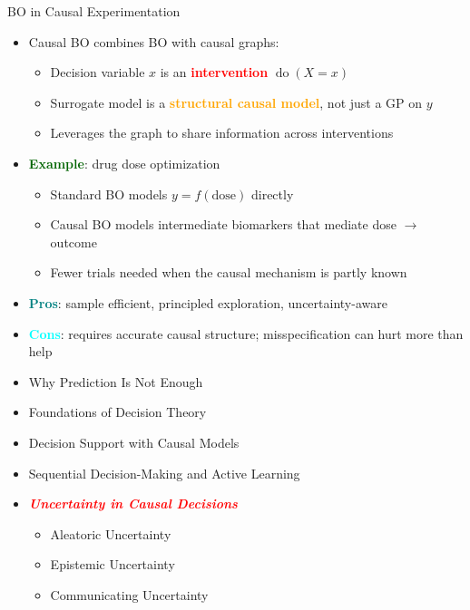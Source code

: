\documentclass[
  10pt,
  ignorenonframetext,
]{beamer}
\providecommand{\tightlist}{%
  \setlength{\itemsep}{0pt}\setlength{\parskip}{0pt}}
\begin{document}
\begin{frame}{BO in Causal Experimentation}
\label{bo-in-causal-experimentation}
\begin{itemize}
\tightlist
\item
  Causal BO combines BO with causal graphs:

  \begin{itemize}
  \tightlist
  \item
    Decision variable \(x\) is an \textbf{\textcolor{red}{intervention}}
    \(\operatorname{do}(X = x)\)
  \item
    Surrogate model is a
    \textbf{\textcolor{orange}{structural causal model}}, not just a GP
    on \(y\)
  \item
    Leverages the graph to share information across interventions
  \end{itemize}
\item
  \textbf{\textcolor{darkgreen}{Example}}: drug dose optimization

  \begin{itemize}
  \tightlist
  \item
    Standard BO models \(y = f(\text{dose})\) directly
  \item
    Causal BO models intermediate biomarkers that mediate dose \(\to\)
    outcome
  \item
    Fewer trials needed when the causal mechanism is partly known
  \end{itemize}
\item
  \textbf{\textcolor{teal}{Pros}}: sample efficient, principled
  exploration, uncertainty-aware
\item
  \textbf{\textcolor{cyan}{Cons}}: requires accurate causal structure;
  misspecification can hurt more than help
\end{itemize}
\end{frame}

\begin{frame}{}
\label{section-16}
\begin{itemize}
\tightlist
\item
  Why Prediction Is Not Enough
\item
  Foundations of Decision Theory
\item
  Decision Support with Causal Models
\item
  Sequential Decision-Making and Active Learning
\item
  \emph{\textbf{\textcolor{red}{Uncertainty in Causal Decisions}}}

  \begin{itemize}
  \tightlist
  \item
    Aleatoric Uncertainty
  \item
    Epistemic Uncertainty
  \item
    Communicating Uncertainty
  \end{itemize}
\end{itemize}
\end{frame}
\end{document}
